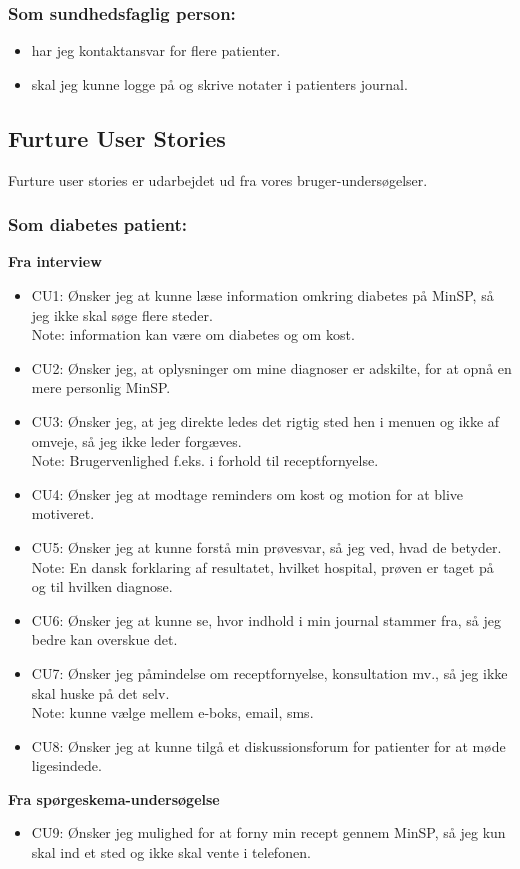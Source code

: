 \subsubsection*{Som sundhedsfaglig person:}
\begin{itemize}
\item har jeg kontaktansvar for flere patienter.
\item skal jeg kunne logge på og skrive notater i patienters journal.
\end{itemize}
\subsection{Furture User Stories}
Furture user stories er udarbejdet ud fra vores bruger-undersøgelser.
\subsubsection*{Som diabetes patient:}
\textbf{Fra interview}\\
\begin{itemize}
\item CU1: Ønsker jeg at kunne læse information omkring diabetes på MinSP, så jeg ikke skal søge flere steder. \\
Note: information kan være om diabetes og om kost.
\item CU2: Ønsker jeg, at oplysninger om mine diagnoser er adskilte, for at opnå en mere personlig MinSP. 
\item CU3: Ønsker jeg, at jeg direkte ledes det rigtig sted hen i menuen og ikke af omveje, så jeg ikke leder forgæves.\\ 
Note: Brugervenlighed f.eks. i forhold til receptfornyelse.
\item CU4: Ønsker jeg at modtage reminders om kost og motion for at blive motiveret.
\item CU5: Ønsker jeg at kunne forstå min prøvesvar, så jeg ved, hvad de betyder. \\
Note: En dansk forklaring af resultatet, hvilket hospital, prøven er taget på og til hvilken diagnose. 
\item CU6: Ønsker jeg at kunne se, hvor indhold i min journal stammer fra, så jeg bedre kan overskue det.
\item CU7: Ønsker jeg påmindelse om receptfornyelse, konsultation mv., så jeg ikke skal huske på det selv.\\ 
Note: kunne vælge mellem e-boks, email, sms.
\item CU8: Ønsker jeg at kunne tilgå et diskussionsforum for patienter for at møde ligesindede.
\end{itemize}
\textbf{Fra spørgeskema-undersøgelse}\\
\begin{itemize}
\item CU9: Ønsker jeg mulighed for at forny min recept gennem MinSP, så jeg kun skal ind et sted og ikke skal vente i telefonen.
\end{itemize}
%
%
